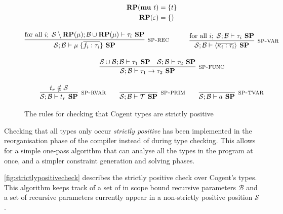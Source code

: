 \begin{figure}
    \centering
    \begin{gather*}
        \begin{split}
            \textbf{RP}(\textbf{mu } t) &= \{t\} \\
            \textbf{RP}(\varepsilon) &= \{\}
        \end{split} \\[10pt]
        \infer[\textsc{sp-rec}]{
            \mathcal{S}; \mathcal{B} \vdash \mu\; \{\overline { f_i : \tau_i } \} \textbf{ SP}
        }{
            \text{for all } i;\; \mathcal{S}\setminus \textbf{RP}(\mu); \mathcal{B} \cup \textbf{RP}(\mu) \vdash \tau_i \textbf{ SP}
        }
        \hspace{3em}
        \infer[\textsc{sp-var}]{
            \mathcal{S}; \mathcal{B} \vdash \langle\overline{\kappa_i : \tau_i}\rangle \textbf{ SP}
        }{
            \text{for all } i;\; \mathcal{S}; \mathcal{B} \vdash \tau_i \textbf{ SP}
        } \\[10pt]
        \hspace{3em}
        \infer[\textsc{sp-func}]{
            \mathcal{S}; \mathcal{B} \vdash \tau_1 \rightarrow \tau_2 \textbf{ SP}
        }{
            \mathcal{S} \cup \mathcal{B}; \mathcal{B} \vdash \tau_1 \textbf{ SP}
            &
            \mathcal{S}; \mathcal{B} \vdash \tau_2 \textbf{ SP}
        } \\[10pt]
        \infer[\textsc{sp-rvar}]{
            \mathcal{S}; \mathcal{B} \vdash t_r \textbf{ SP}
        }{
            t_r \notin \mathcal{S}
        }
        \hspace{2em}
        \infer[\textsc{sp-prim}]{
            \mathcal{S}; \mathcal{B} \vdash \mathcal{T} \textbf{ SP}
        }{}
        \hspace{2em}
        \infer[\textsc{sp-tvar}]{
            \mathcal{S}; \mathcal{B} \vdash a \textbf{ SP}
        }{}
    \end{gather*}
    \caption{The rules for checking that Cogent types are strictly positive}
    \label{fig:strictlypositivecheck}
\end{figure}

Checking that all types only occur \emph{strictly positive} has been implemented in the reorganisation phase of the compiler
instead of during type checking. This allows for a simple one-pass algorithm that can 
analyse all the types in the program at once, and a simpler constraint generation and solving phases.

\autoref{fig:strictlypositivecheck} describes the strictly positive check over Cogent's types.
This algorithm keeps track of a set of in scope bound recursive parameters $\mathcal{B}$ and a set of recursive
parameters currently appear in a non-strictly positive position $\mathcal{S}$.

